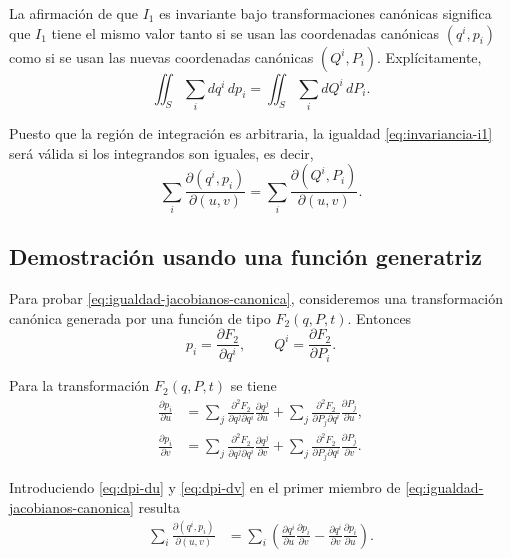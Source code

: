 \documentclass[../apunte_mecanica_clasica.tex]{subfiles}
\begin{document}
La afirmación de que $I_1$ es invariante bajo transformaciones canónicas significa que $I_1$ tiene el mismo valor tanto si se usan las coordenadas canónicas $(q^i,p_i)$ como si se usan las nuevas coordenadas canónicas $(Q^i,P_i)$. Explícitamente,
\begin{equation}
    \iint_S \sum_i dq^i\,dp_i
    =
    \iint_S \sum_i dQ^i\,dP_i.
    \label{eq:invariancia-i1}
\end{equation}

Puesto que la región de integración es arbitraria, la igualdad \eqref{eq:invariancia-i1} será válida si los integrandos son iguales, es decir,
\begin{equation}
    \sum_i \frac{\partial(q^i,p_i)}{\partial(u,v)}
    =
    \sum_i \frac{\partial(Q^i,P_i)}{\partial(u,v)}.
    \label{eq:igualdad-jacobianos-canonica}
\end{equation}

\subsection{Demostración usando una función generatriz}

Para probar \eqref{eq:igualdad-jacobianos-canonica}, consideremos una transformación canónica generada por una función de tipo $F_2(q,P,t)$. Entonces
\begin{equation}
    p_i=\frac{\partial F_2}{\partial q^i},
    \qquad
    Q^i=\frac{\partial F_2}{\partial P_i}.
    \label{eq:generatriz-f2-integrales}
\end{equation}

Para la transformación $F_2(q,P,t)$ se tiene
\begin{align}
    \frac{\partial p_i}{\partial u}
    &=
    \sum_j \frac{\partial^2F_2}{\partial q^j\partial q^i}
    \frac{\partial q^j}{\partial u}
    +
    \sum_j \frac{\partial^2F_2}{\partial P_j\partial q^i}
    \frac{\partial P_j}{\partial u},
    \label{eq:dpi-du} \\
    \frac{\partial p_i}{\partial v}
    &=
    \sum_j \frac{\partial^2F_2}{\partial q^j\partial q^i}
    \frac{\partial q^j}{\partial v}
    +
    \sum_j \frac{\partial^2F_2}{\partial P_j\partial q^i}
    \frac{\partial P_j}{\partial v}.
    \label{eq:dpi-dv}
\end{align}

Introduciendo \eqref{eq:dpi-du} y \eqref{eq:dpi-dv} en el primer miembro de \eqref{eq:igualdad-jacobianos-canonica} resulta
\begin{align}
    \sum_i \frac{\partial(q^i,p_i)}{\partial(u,v)}
    &=
    \sum_i
    \left(
    \frac{\partial q^i}{\partial u}\frac{\partial p_i}{\partial v}
    -
    \frac{\partial q^i}{\partial v}\frac{\partial p_i}{\partial u}
    \right) .
    \label{eq:expansion-primer-miembro}
\end{align}
\end{document}
